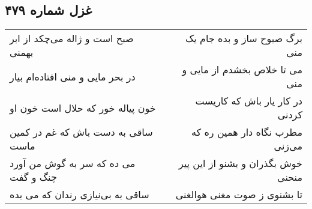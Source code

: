 \begin{center}
\section*{غزل شماره ۴۷۹}
\label{sec:sh479}
\begin{longtable}{l p{0.5cm} r}
صبح است و ژاله می‌چکد از ابر بهمنی
&&
برگ صبوح ساز و بده جام یک منی
\\
در بحر مایی و منی افتاده‌ام بیار
&&
می تا خلاص بخشدم از مایی و منی
\\
خون پیاله خور که حلال است خون او
&&
در کار یار باش که کاریست کردنی
\\
ساقی به دست باش که غم در کمین ماست
&&
مطرب نگاه دار همین ره که می‌زنی
\\
می ده که سر به گوش من آورد چنگ و گفت
&&
خوش بگذران و بشنو از این پیر منحنی
\\
ساقی به بی‌نیازی رندان که می بده
&&
تا بشنوی ز صوت مغنی هوالغنی
\\
\end{longtable}
\end{center}
